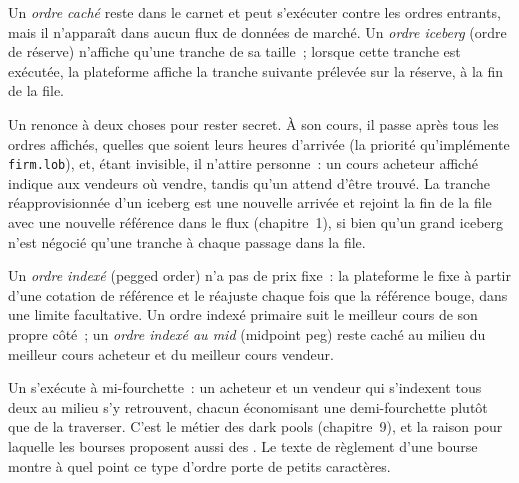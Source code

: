 \begin{definition}\label{def:mx:order-types-and-their-uses:hidden}
Un \emph{ordre caché} reste dans le carnet et peut s'exécuter contre les ordres entrants, mais il n'apparaît dans aucun flux de données de marché. Un \emph{ordre iceberg
} (ordre de réserve) n'affiche qu'une tranche de sa taille~; lorsque cette tranche est exécutée, la plateforme affiche la tranche suivante prélevée sur la
réserve, à la fin de la file.
\end{definition}

Un  renonce à deux choses pour rester secret. À son cours, il passe après tous les ordres affichés, quelles que soient leurs heures d'arrivée (la priorité
qu'implémente \texttt{firm.lob}), et, étant invisible, il n'attire personne~: un cours acheteur affiché indique aux vendeurs où vendre, tandis qu'un  attend d'être trouvé.
La tranche réapprovisionnée d'un iceberg est une nouvelle arrivée et rejoint la fin de la file avec une nouvelle référence dans le flux (chapitre~1), si bien qu'un grand iceberg
n'est négocié qu'une tranche à chaque passage dans la file.

\begin{definition}\label{def:mx:order-types-and-their-uses:peg}
Un \emph{ordre indexé} (pegged order) n'a pas de prix fixe~: la plateforme le fixe à partir d'une cotation de référence et le réajuste chaque fois que la référence bouge,
dans une limite facultative. Un ordre indexé primaire suit le meilleur cours de son propre côté~; un \emph{ordre indexé au mid} (midpoint peg) reste caché au milieu
du meilleur cours acheteur et du meilleur cours vendeur.
\end{definition}

Un  s'exécute à mi-fourchette~: un acheteur et un vendeur qui s'indexent tous deux au milieu s'y retrouvent, chacun économisant une demi-fourchette plutôt que de la traverser.
C'est le métier des dark pools (chapitre~9), et la raison pour laquelle les bourses proposent aussi des . Le texte de règlement d'une bourse montre à quel point
ce type d'ordre porte de petits caractères.

